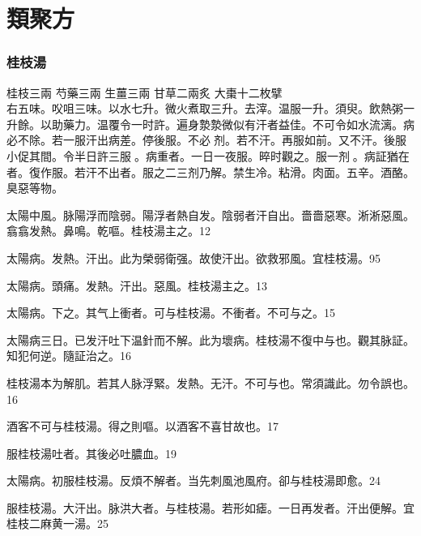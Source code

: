 






\maketitle

\tableofcontents

\part{類聚方}

\section{桂枝湯}

桂枝{\scriptsize 三兩} 芍藥{\scriptsize 三兩} 生薑{\scriptsize 三兩} 甘草{\scriptsize 二兩炙} 大棗{\scriptsize 十二枚擘}\\
右五味。㕮咀三味。以水七升。微火煮取三升。去滓。温服一升。須臾。飲熱粥一升餘。以助藥力。温覆令一时許。遍身漐漐微似有汗者益佳。不可令如水流漓。病必不除。若一服汗出病差。停後服。不必{\sungtpii 𥁞}剂。若不汗。再服如前。又不汗。後服小促其間。令半日許三服{\sungtpii 𥁞}。病重者。一日一夜服。晬时觀之。服一剂{\sungtpii 𥁞}。病証猶在者。復作服。若汗不出者。服之二三剂乃解。{\khaaitp 禁生冷。粘滑。肉面。五辛。酒酪。臭惡等物。}

太陽中風。{\khaaitp 脉}陽浮而陰弱。陽浮者熱自发。陰弱者汗自出。嗇嗇惡寒。淅淅惡風。翕翕发熱。鼻鳴。乾嘔。桂枝湯主之。12

太陽病。发熱。汗出。此为榮弱衛强。故使汗出。欲救邪風。宜桂枝湯。95

太陽病。頭痛。发熱。汗出。惡風。桂枝湯主之。13

太陽病。下之。其气上衝者。可与桂枝湯。不衝者。不可与之。15

太陽病三日。已发汗吐下温針而不解。此为壞病。桂枝湯不復中与也。觀其脉証。知犯何逆。隨証治之。16

桂枝湯本为解肌。若其人脉浮緊。发熱。无汗。不可与也。常須識此。勿令誤也。16

酒客不可与桂枝湯。得之則嘔。以酒客不喜甘故也。17

服桂枝湯吐者。其後必吐膿血。19

太陽病。初服桂枝湯。反煩不解者。当先刺風池風府。卻与桂枝湯即愈。24

服桂枝湯。大汗出。脉洪大者。与桂枝湯。若形如瘧。一日再发者。汗出便解。宜桂枝二麻黄一湯。25

